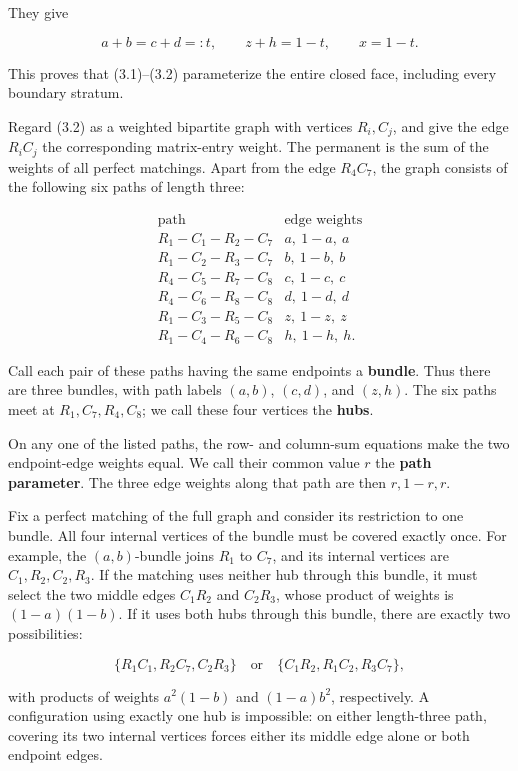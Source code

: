 \documentclass[11pt]{article}
\theoremstyle{definition}
\begin{document}
They give

\[
a+b=c+d=:t,\qquad z+h=1-t,\qquad x=1-t.
\]

This proves that (3.1)--(3.2) parameterize the entire closed face, including
every boundary stratum.

Regard (3.2) as a weighted bipartite graph with vertices \(R_i,C_j\), and give
the edge \(R_iC_j\) the corresponding matrix-entry weight. The permanent is
the sum of the weights of all perfect matchings. Apart from the edge
\(R_4C_7\), the graph consists of the following six paths of length three:

\[
\begin{array}{c|c}
\text{path}&\text{edge weights}\\ \hline
R_1-C_1-R_2-C_7&a,\ 1-a,\ a\\
R_1-C_2-R_3-C_7&b,\ 1-b,\ b\\
R_4-C_5-R_7-C_8&c,\ 1-c,\ c\\
R_4-C_6-R_8-C_8&d,\ 1-d,\ d\\
R_1-C_3-R_5-C_8&z,\ 1-z,\ z\\
R_1-C_4-R_6-C_8&h,\ 1-h,\ h.
\end{array}
\]

Call each pair of these paths having the same endpoints a \textbf{bundle}. Thus
there are three bundles, with path labels \((a,b)\), \((c,d)\), and \((z,h)\).
The six paths meet at \(R_1,C_7,R_4,C_8\); we call these four vertices the
\textbf{hubs}.

On any one of the listed paths, the row- and column-sum equations make the
two endpoint-edge weights equal. We call their common value \(r\) the
\textbf{path parameter}. The three edge weights along that path are then
\(r,1-r,r\).

Fix a perfect matching of the full graph and consider its restriction to one
bundle. All four internal vertices of the bundle must be covered exactly once.
For example, the \((a,b)\)-bundle joins \(R_1\) to \(C_7\), and its internal
vertices are \(C_1,R_2,C_2,R_3\). If the matching uses neither hub through
this bundle, it must select the two middle edges \(C_1R_2\) and \(C_2R_3\),
whose product of weights is \((1-a)(1-b)\). If it uses both hubs through this
bundle, there are exactly two possibilities:

\[
\{R_1C_1,R_2C_7,C_2R_3\}
\quad\text{or}\quad
\{C_1R_2,R_1C_2,R_3C_7\},
\]

with products of weights \(a^2(1-b)\) and \((1-a)b^2\), respectively. A
configuration using exactly one hub is impossible: on either length-three
path, covering its two internal vertices forces either its middle edge alone
or both endpoint edges.
\end{document}
